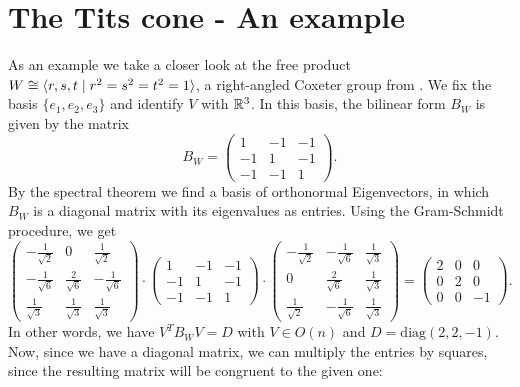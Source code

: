 \section{The Tits cone - An example} %

As an example we take a closer look at the free product \(W \cong\langle r,s,t\;\vert\;r^2=s^2=t^2=1\rangle\), a right-angled Coxeter group from .
We fix the basis \(\{e_1,e_2,e_3\}\) and identify \(V\) with \(\mathbb{R}^3\).
In this basis, the bilinear form \(B_W\) is given by the matrix
\begin{equation*}
    B_W =
    \begin{pmatrix}
        1  & -1 & -1 \\
        -1 & 1  & -1 \\
        -1 & -1 & 1
    \end{pmatrix}.
\end{equation*}
By the spectral theorem we find a basis of orthonormal Eigenvectors, in which \(B_W\) is a diagonal matrix with its eigenvalues as entries.
Using the Gram-Schmidt procedure, we get
\begin{equation*}
    \begin{pmatrix}
        -\frac{1}{\sqrt{2}} & 0                  & \frac{1}{\sqrt{2}}  \\
        -\frac{1}{\sqrt{6}} & \frac{2}{\sqrt{6}} & -\frac{1}{\sqrt{6}} \\
        \frac{1}{\sqrt{3}}  & \frac{1}{\sqrt{3}} & \frac{1}{\sqrt{3}}
    \end{pmatrix} \cdot
    \begin{pmatrix}
        1  & -1 & -1 \\
        -1 & 1  & -1 \\
        -1 & -1 & 1
    \end{pmatrix} \cdot
    \begin{pmatrix}
        -\frac{1}{\sqrt{2}} & -\frac{1}{\sqrt{6}} & \frac{1}{\sqrt{3}} \\
        0                   & \frac{2}{\sqrt{6}}  & \frac{1}{\sqrt{3}} \\
        \frac{1}{\sqrt{2}}  & -\frac{1}{\sqrt{6}} & \frac{1}{\sqrt{3}}
    \end{pmatrix} =
    \begin{pmatrix}
        2 & 0 & 0  \\
        0 & 2 & 0  \\
        0 & 0 & -1
    \end{pmatrix}.
\end{equation*}
In other words, we have \(V^T B_W V = D\) with \(V\in O(n)\) and \(D = \text{diag}(2,2,-1)\).
Now, since we have a diagonal matrix, we can multiply the entries by squares, since the resulting matrix will be congruent to the given one:

